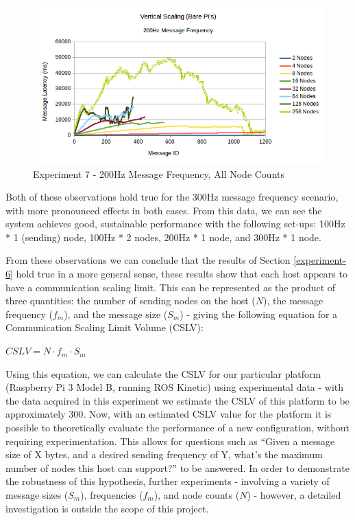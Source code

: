 \documentclass[../dissertation.tex]{subfiles}
\begin{document}
\begin{figure}[H]
\centering
\includegraphics[width=\textwidth]{images/experiment7/vertical_scaling_200hz_all_node_counts.png}
\caption{Experiment 7 - 200Hz Message Frequency, All Node Counts}
\label{exp7-200hz-allnodes}
\end{figure}

Both of these observations hold true for the 300Hz message frequency scenario, with more pronounced effects in both cases. From this data, we can see the system achieves good, sustainable performance with the following set-ups: 100Hz * 1 (sending) node, 100Hz * 2 nodes, 200Hz * 1 node, and 300Hz * 1 node.

From these observations we can conclude that the results of Section \ref{experiment-6} hold true in a more general sense, these results show that each host appears to have a communication scaling limit. This can be represented as the product of three quantities: the number of sending nodes on the host ($N$), the message frequency ($f_m$), and the message size ($S_m$) - giving the following equation for a Communication Scaling Limit Volume (CSLV):

\begin{center}
$CSLV = N \cdot f_m \cdot S_m$
\end{center}

Using this equation, we can calculate the CSLV for our particular platform (Raspberry Pi 3 Model B, running ROS Kinetic) using experimental data - with the data acquired in this experiment we estimate the CSLV of this platform to be approximately 300. Now, with an estimated CSLV value for the platform it is possible to theoretically evaluate the performance of a new configuration, without requiring experimentation. This allows for questions such as ``Given a message size of X bytes, and a desired sending frequency of Y, what's the maximum number of nodes this host can support?'' to be answered. In order to demonstrate the robustness of this hypothesis, further experiments - involving a variety of message sizes ($S_m$), frequencies ($f_m$), and node counts ($N$) - however, a detailed investigation is outside the scope of this project.
\end{document}
